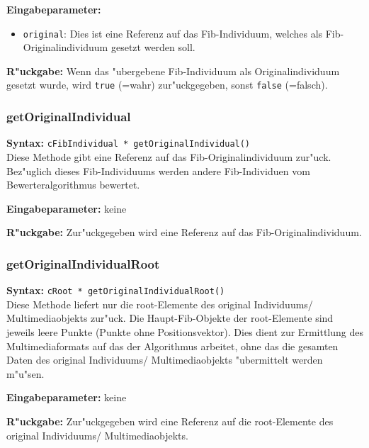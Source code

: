 \bigskip\noindent
\textbf{Eingabeparameter:}
\begin{itemize}
 \item \verb|original|: Dies ist eine Referenz auf das Fib-Individuum, welches als Fib-Originalindividuum gesetzt werden soll.
\end{itemize}

\bigskip\noindent
\textbf{R"uckgabe:} Wenn das "ubergebene Fib-Individuum als Originalindividuum gesetzt wurde, wird \verb|true| (=wahr) zur"uckgegeben, sonst \verb|false| (=falsch).


\subsubsection{getOriginalIndividual}

\textbf{Syntax:} \verb|cFibIndividual * getOriginalIndividual()| \\

Diese Methode gibt eine Referenz auf das Fib-Originalindividuum zur"uck. Bez"uglich dieses Fib-Individuums werden andere Fib-Individuen vom Bewerteralgorithmus bewertet.

\bigskip\noindent
\textbf{Eingabeparameter:} keine

\bigskip\noindent
\textbf{R"uckgabe:} Zur"uckgegeben wird eine Referenz auf das Fib-Originalindividuum.


\subsubsection{getOriginalIndividualRoot}

\textbf{Syntax:} \verb|cRoot * getOriginalIndividualRoot()| \\

Diese Methode liefert nur die root-Elemente des original Individuums/ Multimediaobjekts zur"uck. Die Haupt-Fib-Objekte der root-Elemente sind jeweils leere Punkte (Punkte ohne Positionsvektor).
Dies dient zur Ermittlung des Multimediaformats auf das der Algorithmus arbeitet, ohne das die gesamten Daten des original Individuums/ Multimediaobjekts "ubermittelt werden m"u"sen.

\bigskip\noindent
\textbf{Eingabeparameter:} keine

\bigskip\noindent
\textbf{R"uckgabe:} Zur"uckgegeben wird eine Referenz auf die root-Elemente des original Individuums/ Multimediaobjekts.


